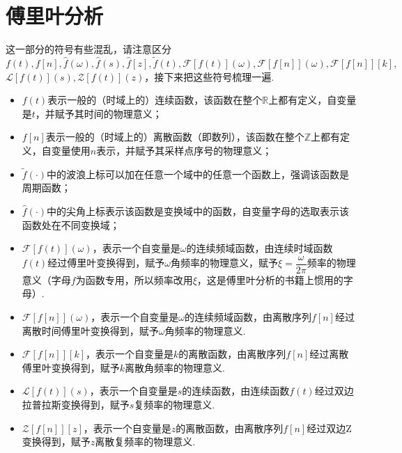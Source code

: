 
\part{傅里叶分析}
\setcounter{section}{0}

这一部分的符号有些混乱，请注意区分\(f(t), f[n], \hat{f}(\omega), \hat{f}(s), \hat{f}[z], \tilde{f}(t), \mathcal{F}[f(t)](\omega),\mathcal{F}[f[n]](\omega), \mathcal{F}[f[n]][k],\)
\newline
\( \mathcal{L}[f(t)](s), \mathcal{Z}[f(t)](z)\)，接下来把这些符号梳理一遍.
\newline
\begin{itemize}
    \item[\(\bullet\)] \(f(t)\)表示一般的（时域上的）连续函数，该函数在整个\(\mathbb{R}\)上都有定义，自变量是\(t\)，并赋予其时间的物理意义；
    \item[\(\bullet\)] \(f[n]\)表示一般的（时域上的）离散函数（即数列），该函数在整个\(\mathbb{Z}\)上都有定义，自变量使用\(n\)表示，并赋予其采样点序号的物理意义；
    \item[\(\bullet\)] \(\tilde{f}(\cdot)\)中的波浪上标可以加在任意一个域中的任意一个函数上，强调该函数是周期函数；
    \item[\(\bullet\)] \(\hat{f}(\cdot)\)中的尖角上标\(\hat{}\)表示该函数是变换域中的函数，自变量字母的选取表示该函数处在不同变换域；
    \item[\(\bullet\)] \(\mathcal{F}\left[f(t)\right](\omega)\)，表示一个自变量是\(\omega\)的连续频域函数，由连续时域函数\(f(t)\)经过傅里叶变换得到，赋予\(\omega\)角频率的物理意义，赋予\(\xi=\dfrac{\omega}{2 \pi}\)频率的物理意义（字母\(f\)为函数专用，所以频率改用\(\xi\)，这是傅里叶分析的书籍上惯用的字母）. 
    \item[\(\bullet\)] \(\mathcal{F}\left[f[n]\right](\omega)\)，表示一个自变量是\(\omega\)的连续频域函数，由离散序列\(f[n]\)经过离散时间傅里叶变换得到，赋予\(\omega\)角频率的物理意义.
    \item[\(\bullet\)] \(\mathcal{F}\left[f[n]\right][k]\)，表示一个自变量是\(k\)的离散函数，由离散序列\(f[n]\)经过离散傅里叶变换得到，赋予\(k\)离散角频率的物理意义.
    \item[\(\bullet\)] \(\mathcal{L}\left[f(t)\right](s)\)，表示一个自变量是\(s\)的连续函数，由连续函数\(f(t)\)经过双边拉普拉斯变换得到，赋予\(s\)复频率的物理意义.
    \item[\(\bullet\)] \(\mathcal{Z}\left[f[n]\right][z]\)，表示一个自变量是\(z\)的离散函数，由离散序列\(f[n]\)经过双边Z变换得到，赋予\(z\)离散复频率的物理意义. 
\end{itemize}

